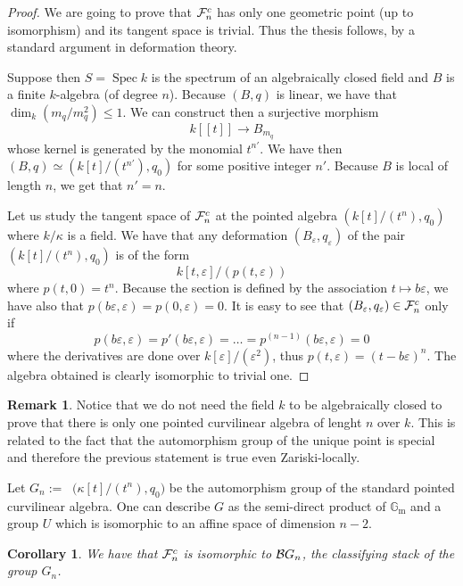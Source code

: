 \documentclass{alggeom}
\numberwithin{equation}{section}
\numberwithin{subsection}{section}
\newtheorem{corollary}[theorem]{Corollary}
\theoremstyle{definition}
\newtheorem{remark}[theorem]{Remark}
\theoremstyle{remark}
\newcommand\GG{\mathbb{G}} \newcommand\HH{\mathbb{H}}
\newcommand\rmm{\mathrm{m}} \newcommand\rmn{\mathrm{n}}
\newcommand\spec{\operatorname{Spec}}
\newcommand{\underaut}{\mathop{\underline{\mathrm{Aut}}}\nolimits}
\newcommand{\gm}{\GG_{\rmm}}
\renewcommand{\epsilon}{\varepsilon}
\begin{document}
\begin{proof}
	We are going to prove that $\mathcal{F}_{n}^c$ has only one geometric point (up to isomorphism) and its tangent space is trivial. Thus the thesis follows, by a standard argument in deformation theory.  
	
	Suppose then $S=\spec k$ is the spectrum of an algebraically closed field and $B$ is a finite $k$-algebra (of degree $n$). Because $(B,q)$ is linear, we have that $\dim_k(m_q/m_q^2)\leq 1$. We can construct then a surjective morphism 
	$$ k[[t]] \longrightarrow B_{m_q}$$
	whose kernel is generated by the monomial $t^{n'}$. We have then $(B,q)\simeq (k[t]/(t^{n'}),q_0)$ for some positive integer $n'$. Because $B$ is local of length $n$, we get that $n'=n$.
	
	
	Let us study the tangent space of $\mathcal{F}_n^c$ at the pointed algebra $(k[t]/(t^{n}),q_0)$ where $k/\kappa$ is a field. We have that any deformation $(B_{\epsilon},q_{\epsilon})$ of the pair $(k[t]/(t^n),q_0)$ is of the form
	$$ k[t,\epsilon]/(p(t,\epsilon))$$
	where $p(t,0)=t^{n}$. Because the section is defined by the association $t\mapsto b\epsilon$, we have also that $p(b\epsilon,\epsilon)=p(0,\epsilon)=0$. It is easy to see that $(B_{\epsilon},q_{\epsilon}) \in \cF^c_{n}$ only if $$p(b\epsilon,\epsilon)=p'(b\epsilon,\epsilon)=\dots=p^{(n-1)}(b\epsilon,\epsilon)=0$$
	where the derivatives are done over $k[\epsilon]/(\epsilon^2)$, thus $p(t,\epsilon)=(t-b\epsilon)^{n}$. The algebra obtained is clearly isomorphic to trivial one.
\end{proof} 

\begin{remark}
 Notice that we do not need the field $k$ to be algebraically closed to prove that there is only one pointed curvilinear algebra of lenght $n$ over $k$. This is related to the fact that the automorphism group of the unique point is special and therefore the previous statement is true even Zariski-locally. 
\end{remark}


Let $G_{n}:=\underaut\Big(\kappa[t]/(t^{n}),q_0\Big)$ be the automorphism group of the standard pointed curvilinear algebra. One can describe $G$ as the semi-direct product of $\gm$ and a group $U$ which is isomorphic to an affine space of dimension $n-2$. 


\begin{corollary}\label{cor:descr-finite-alg}
	We have that $\mathcal{F}_{n}^c$ is isomorphic to $\mathcal{B} G_{n}$, the classifying stack of the group $G_{n}$.
\end{corollary}
\end{document}
